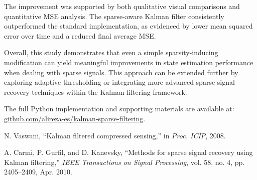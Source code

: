 \documentclass[12pt]{article}
\begin{document}
The improvement was supported by both qualitative visual comparisons and quantitative MSE analysis. The sparse-aware Kalman filter consistently outperformed the standard implementation, as evidenced by lower mean squared error over time and a reduced final average MSE.

Overall, this study demonstrates that even a simple sparsity-inducing modification can yield meaningful improvements in state estimation performance when dealing with sparse signals. This approach can be extended further by exploring adaptive thresholding or integrating more advanced sparse signal recovery techniques within the Kalman filtering framework.

The full Python implementation and supporting materials are available at: \href{https://github.com/alireza-es/kalman-sparse-filtering}{github.com/alireza-es/kalman-sparse-filtering}.



\begin{thebibliography}{1}
N. Vaswani, ``Kalman filtered compressed sensing,'' in 	\textit{Proc. ICIP}, 2008.

A. Carmi, P. Gurfil, and D. Kanevsky, ``Methods for sparse signal recovery using Kalman filtering,'' 	\textit{IEEE Transactions on Signal Processing}, vol. 58, no. 4, pp. 2405--2409, Apr. 2010.
\end{thebibliography}
\end{document}
